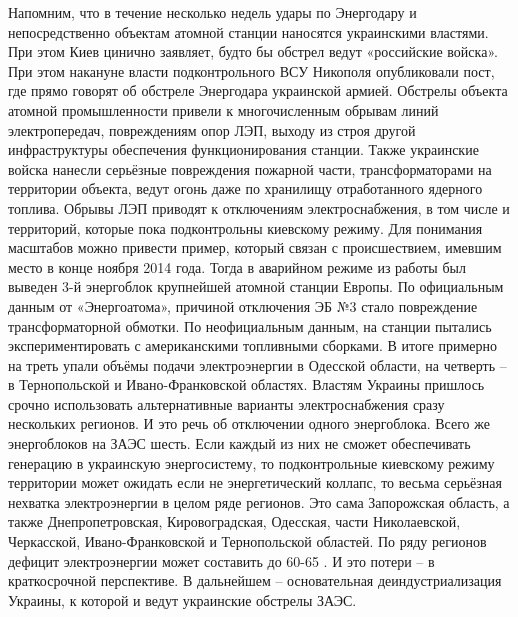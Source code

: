 Напомним, что в течение несколько недель удары по Энергодару и непосредственно объектам атомной станции наносятся украинскими властями. При этом Киев цинично заявляет, будто бы обстрел ведут «российские войска». При этом накануне власти подконтрольного ВСУ Никополя опубликовали пост, где прямо говорят об обстреле Энергодара украинской армией.
Обстрелы объекта атомной промышленности привели к многочисленным обрывам линий электропередач, повреждениям опор ЛЭП, выходу из строя другой инфраструктуры обеспечения функционирования станции. Также украинские войска нанесли серьёзные повреждения пожарной части, трансформаторами на территории объекта, ведут огонь даже по хранилищу отработанного ядерного топлива.
Обрывы ЛЭП приводят к отключениям электроснабжения, в том числе и территорий, которые пока подконтрольны киевскому режиму.
Для понимания масштабов можно привести пример, который связан с происшествием, имевшим место в конце ноября 2014 года. Тогда в аварийном режиме из работы был выведен 3-й энергоблок крупнейшей атомной станции Европы. По официальным данным от «Энергоатома», причиной отключения ЭБ №3 стало повреждение трансформаторной обмотки. По неофициальным данным, на станции пытались экспериментировать с американскими топливными сборками. В итоге примерно на треть упали объёмы подачи электроэнергии в Одесской области, на четверть – в Тернопольской и Ивано-Франковской областях. Властям Украины пришлось срочно использовать альтернативные варианты электроснабжения сразу нескольких регионов. И это речь об отключении одного энергоблока. Всего же энергоблоков на ЗАЭС шесть.
Если каждый из них не сможет обеспечивать генерацию в украинскую энергосистему, то подконтрольные киевскому режиму территории может ожидать если не энергетический коллапс, то весьма серьёзная нехватка электроэнергии в целом ряде регионов. Это сама Запорожская область, а также Днепропетровская, Кировоградская, Одесская, части Николаевской, Черкасской, Ивано-Франковской и Тернопольской областей. По ряду регионов дефицит электроэнергии может составить до 60-65%
. И это потери – в краткосрочной перспективе. В дальнейшем – основательная деиндустриализация Украины, к которой и ведут украинские обстрелы ЗАЭС.
